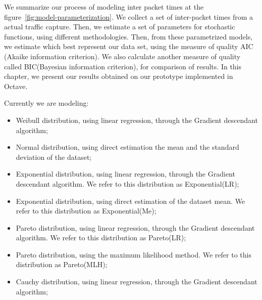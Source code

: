 We summarize our process of modeling inter packet times at the figure~\ref{fig:model-parameterization}. We collect a set of inter-packet times from a actual traffic capture. Then, we estimate a set of parameters for stochastic functions, using different methodologies. Then, from these parametrized models, we estimate which best represent our data set, using the measure of quality AIC (Akaike information criterion). We also calculate another measure of quality called BIC(Bayesian information criterion), for comparison of results. In this chapter, we present our results obtained on our prototype implemented  in Octave.

Currently we are modeling:

\begin{itemize}
\item Weibull distribution, using linear regression, through the Gradient descendant algorithm;
\item Normal distribution, using direct estimation the mean and the standard deviation of the dataset;
\item Exponential distribution, using linear regression, through the Gradient descendant algorithm. We refer to this distribution as Exponential(LR);
\item Exponential distribution, using direct estimation of the dataset mean. We refer to this distribution as Exponential(Me);
\item Pareto distribution, using linear regression, through the Gradient descendant algorithm. We refer to this distribution as Pareto(LR);
\item Pareto distribution, using the maximum likelihood method. We refer to this distribution as Pareto(MLH);
\item Cauchy distribution, using linear regression, through the Gradient descendant algorithm;
\end{itemize}






